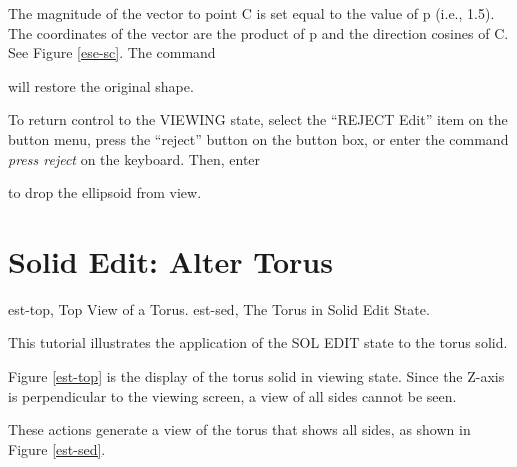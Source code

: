 The magnitude of the vector to point C is set equal to the value of p
(i.e., 1.5).
The coordinates of the vector are the product of p and the
direction cosines of C.  See Figure \ref{ese-sc}.  The command


will restore the original shape.

To return control to the VIEWING state, select the ``REJECT Edit''
item on the button menu, press the ``reject'' button on the button box,
or enter the command {\em press reject} on the keyboard.
Then, enter


to drop the ellipsoid from view.

\section{Solid Edit: Alter Torus}
\mfig est-top, Top View of a Torus.
\mfig est-sed, The Torus in Solid Edit State.

This tutorial illustrates the application of the SOL EDIT state to the
torus solid.


Figure \ref{est-top} is the display of the torus solid in viewing state.
Since the
Z-axis is perpendicular to the viewing screen, a view of all sides cannot be
seen.


These actions generate a view of the torus that shows all sides,
as shown in Figure \ref{est-sed}.


